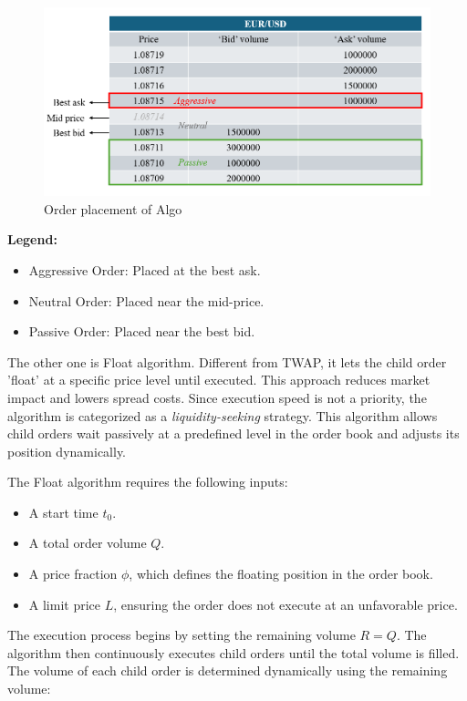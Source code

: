 \begin{figure}[h]
    \centering
    \includegraphics[width=\linewidth]{figures/order placement.png}
    \caption{Order placement of Algo}
    \label{fig:order placement}
\end{figure}

\noindent \textbf{Legend:}
\begin{itemize}
    \item Aggressive Order: Placed at the best ask.
    \item Neutral Order: Placed near the mid-price.
    \item Passive Order: Placed near the best bid.
\end{itemize}

The other one is Float algorithm. Different from TWAP, it lets the child order 'float' at a specific price level until executed. This approach reduces market impact and lowers spread costs. Since execution speed is not a priority, the algorithm is categorized as a \textit{liquidity-seeking} strategy. This algorithm allows child orders wait passively at a predefined level in the order book and adjusts its position dynamically.

The Float algorithm requires the following inputs:
\begin{itemize}
    \item A start time $t_0$.
    \item A total order volume $Q$.
    \item A price fraction $\phi$, which defines the floating position in the order book.
    \item A limit price $L$, ensuring the order does not execute at an unfavorable price.
\end{itemize}

The execution process begins by setting the remaining volume $R = Q$. The algorithm then continuously executes child orders until the total volume is filled. The volume of each child order is determined dynamically using the remaining volume:

